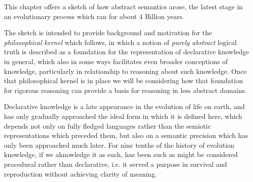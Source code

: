 This chapter offers a sketch of how abstract semantics arose, the latest stage in an evolutionary process which ran for about 4 Billion years.

The sketch is intended to provide background and motivation for the \emph{philosophical kernel} which follows, in which a notion of \emph{purely abstract} logical truth is described as a foundation for the representation of declarative knowledge in general, which also in some ways facilitates even broader conceptions of knowledge, particularly in relationship to reasoning about such knowledge.
Once that philosophical kernel is in place we will be considering how that foundation for rigorous reasoning can provide a basis for reasoning in less abstract domains.

Declarative knowledge is a late appearance in the evolution of life on earth, and has only gradually approached the ideal form in which it is defined here, which depends not only on fully fledged languages rather than the semiotic representations which preceded them, but also on a semantic precision which has only been approached much later.
For nine tenths of the history of evolution knowledge, if we aknowledge it as such, has been such as might be considered procedural rather than declarative, i.e. it served a purpose in survival and reproduction without achieving clarity of meaning.
